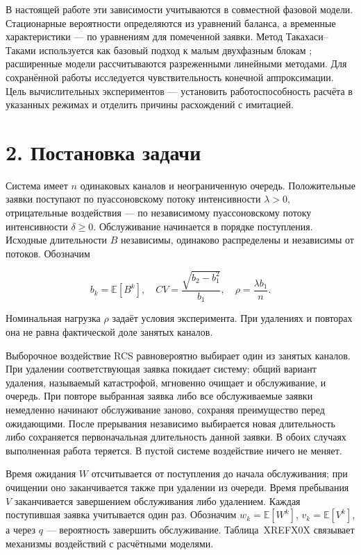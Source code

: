 В настоящей работе эти зависимости учитываются в совместной фазовой модели. Стационарные вероятности определяются из уравнений баланса, а временные характеристики --- по уравнениям для помеченной заявки. Метод Такахаси--Таками используется как базовый подход к малым двухфазным блокам \cite{takahashi1976,ryzhikov2018ru}; расширенные модели рассчитываются разреженными линейными методами. Для сохранённой работы исследуется чувствительность конечной аппроксимации. Цель вычислительных экспериментов --- установить работоспособность расчёта в указанных режимах и отделить причины расхождений с имитацией.

\section*{2. Постановка задачи}
Система имеет \(n\) одинаковых каналов и неограниченную очередь. Положительные заявки поступают по пуассоновскому потоку интенсивности \(\lambda>0\), отрицательные воздействия --- по независимому пуассоновскому потоку интенсивности \(\delta\ge0\). Обслуживание начинается в порядке поступления. Исходные длительности \(B\) независимы, одинаково распределены и независимы от потоков. Обозначим


\[b_k=\mathbb E[B^k],\quad CV=\frac{\sqrt{b_2-b_1^2}}{b_1},\quad \rho=\frac{\lambda b_1}{n}.\]


Номинальная нагрузка \(\rho\) задаёт условия эксперимента. При удалениях и повторах она не равна фактической доле занятых каналов.

Выборочное воздействие RCS равновероятно выбирает один из занятых каналов. При удалении соответствующая заявка покидает систему; общий вариант удаления, называемый катастрофой, мгновенно очищает и обслуживание, и очередь. При повторе выбранная заявка либо все обслуживаемые заявки немедленно начинают обслуживание заново, сохраняя преимущество перед ожидающими. После прерывания независимо выбирается новая длительность либо сохраняется первоначальная длительность данной заявки. В обоих случаях выполненная работа теряется. В пустой системе воздействие ничего не меняет.

Время ожидания \(W\) отсчитывается от поступления до начала обслуживания; при очищении оно заканчивается также при удалении из очереди. Время пребывания \(V\) заканчивается завершением обслуживания либо удалением. Каждая поступившая заявка учитывается один раз. Обозначим \(w_k=\mathbb E[W^k]\), \(v_k=\mathbb E[V^k]\), а через \(q\) --- вероятность завершить обслуживание. Таблица~XREFX0X связывает механизмы воздействий с расчётными моделями.

